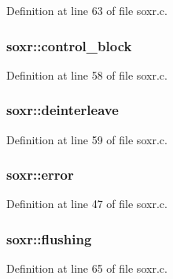 Definition at line 63 of file soxr.\+c.

\subsubsection[{\texorpdfstring{control\+\_\+block}{control_block}}]{ soxr\+::control\+\_\+block}\hypertarget{structsoxr_a89d093b499c528f01c5e53f282d68310}{}\label{structsoxr_a89d093b499c528f01c5e53f282d68310}


Definition at line 58 of file soxr.\+c.

\subsubsection[{\texorpdfstring{deinterleave}{deinterleave}}]{ soxr\+::deinterleave}\hypertarget{structsoxr_a5628a132543e83108ce76ac059f85a9f}{}\label{structsoxr_a5628a132543e83108ce76ac059f85a9f}


Definition at line 59 of file soxr.\+c.

\subsubsection[{\texorpdfstring{error}{error}}]{ soxr\+::error}\hypertarget{structsoxr_a67c1c91e4377ab564c67acde95822038}{}\label{structsoxr_a67c1c91e4377ab564c67acde95822038}


Definition at line 47 of file soxr.\+c.

\subsubsection[{\texorpdfstring{flushing}{flushing}}]{ soxr\+::flushing}\hypertarget{structsoxr_af68d052dcfcdb459b273fdf8e6b234a4}{}\label{structsoxr_af68d052dcfcdb459b273fdf8e6b234a4}


Definition at line 65 of file soxr.\+c.

